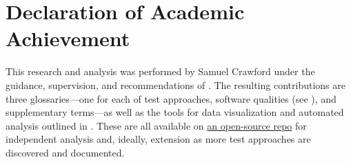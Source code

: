 \chapter{Declaration of Academic Achievement}
\label{decl_aca_ach}

This research and analysis was performed by Samuel Crawford under the
guidance, supervision, and recommendations of \supers{}. The resulting
contributions are three glossaries---one for
each of test approaches, software qualities (see ), and
supplementary terms---as well as the tools for data visualization and
automated analysis outlined in . These are all available on
\href{https://github.com/samm82/TestingTesting}{an open-source repo}
for independent analysis and, ideally, extension as more test approaches are
discovered and documented.
